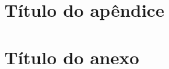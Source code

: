 \documentclass[
	12pt,					%
	openright,				%
	oneside,				%
	a4paper,				%
	chapter=TITLE,			%
	brazil,
	english
]{abnt/abntex2itv_report}
\begin{document}

\begin{flushleft}
\ABNTEXchapterfont\Large\textbf{\MakeUppercase\glosariotitlename}
\end{flushleft}
\vspace*{-36pt}
\normalsize
\normalfont
\tableofcontents*
\justify


\setlength\beforechapskip{-24pt}
\setlength\afterchapskip{12pt}
\textual
\pagestyle{plain}
\normalsize
\justify
\normalfont



\cleardoublepage
\titleformat{\chapter}[display]{\vspace*{-24pt}\ABNTEXchapterfont\large\bfseries}{\chaptertitlename\ \thechapter}{12pt}{\Large}



\apendices
\justify
\chapter{Título do apêndice}

\lipsum[1] %


\anexos
\justify
\chapter{Título do anexo}

\lipsum[1] %
\end{document}
